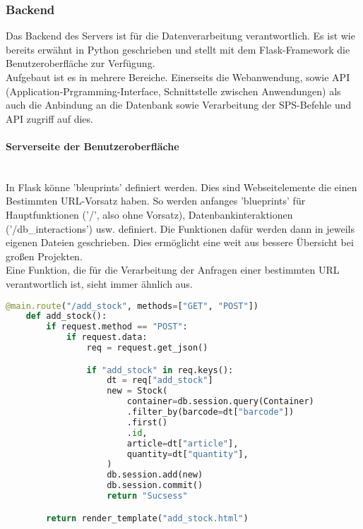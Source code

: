 \subsubsection{Backend}
Das Backend des Servers ist für die Datenverarbeitung verantwortlich. Es ist wie bereits erwähnt in Python geschrieben und stellt mit dem Flask-Framework die Benutzeroberfläche zur Verfügung. \\
Aufgebaut ist es in mehrere Bereiche. Einerseits die Webanwendung, sowie API (Application-Prgramming-Interface, Schnittstelle zwischen Anwendungen) als auch die Anbindung an die Datenbank sowie Verarbeitung der SPS-Befehle und API zugriff auf dies.

\paragraph{Serverseite der Benutzeroberfläche}\mbox{}\\
In Flask könne 'bleuprints' definiert werden. Dies sind Webseitelemente die einen Bestimmten URL-Vorsatz haben. So werden anfanges 'blueprints' für Hauptfunktionen ('/', also ohne Vorsatz), Datenbankinteraktionen ('/db\_interactions') usw. definiert. Die Funktionen dafür werden dann in jeweils eigenen Dateien geschrieben. Dies ermöglicht eine weit aus bessere Übersicht bei großen Projekten. \\
Eine Funktion, die für die Verarbeitung der Anfragen einer bestimmten URL verantwortlich ist, sieht immer ähnlich aus.

\begin{lstlisting}[language=Python]
    @main.route("/add_stock", methods=["GET", "POST"])
    def add_stock():
        if request.method == "POST":
            if request.data:
                req = request.get_json()

                if "add_stock" in req.keys():
                    dt = req["add_stock"]
                    new = Stock(
                        container=db.session.query(Container)
                        .filter_by(barcode=dt["barcode"])
                        .first()
                        .id,
                        article=dt["article"],
                        quantity=dt["quantity"],
                    )
                    db.session.add(new)
                    db.session.commit()
                    return "Sucsess"

        return render_template("add_stock.html")
\end{lstlisting}  

